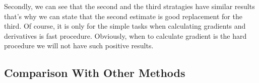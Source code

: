 \documentclass[12pt]{article}
\begin{document}
Secondly, we can see that the second and the third stratagies have similar results that's why we can state that the second estimate is good replacement for the third. Of course, it is only for the simple tasks when calculating gradients and derivatives is fast procedure. Obviously, when to calculate gradient is the hard procedure we will not have such positive results.

\subsection{Comparison With Other Methods}
\label{Comparison}

\begin{figure}[ht!]  
\vspace{-4ex} \centering {}  
\hspace{2ex}
\vspace{2ex}
\hspace{2ex}
\vspace{2ex}

\end{figure}
\end{document}
